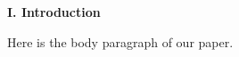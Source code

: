 \documentclass{article}
\begin{document}
\textbf{I. Introduction}
\EndAccSupp

Here is the body paragraph of our paper.
\end{document}
